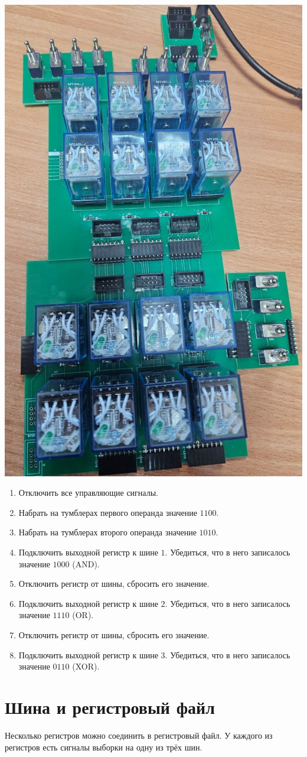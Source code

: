 \includegraphics[width=0.5\columnwidth]{photo/logic.jpg}

\begin{enumerate}
    \item Отключить все управляющие сигналы.
    \item Набрать на тумблерах первого операнда значение $1100$.
    \item Набрать на тумблерах второго операнда значение $1010$.
    \item Подключить выходной регистр к шине $1$. Убедиться, что в него записалось значение $1000$ (AND).
    \item Отключить регистр от шины, сбросить его значение.
    \item Подключить выходной регистр к шине $2$. Убедиться, что в него записалось значение $1110$ (OR).
    \item Отключить регистр от шины, сбросить его значение.
    \item Подключить выходной регистр к шине $3$. Убедиться, что в него записалось значение $0110$ (XOR).
\end{enumerate}




\section{Шина и регистровый файл}

Несколько регистров можно соединить в регистровый файл.
У каждого из регистров есть сигналы выборки на одну из трёх шин.

